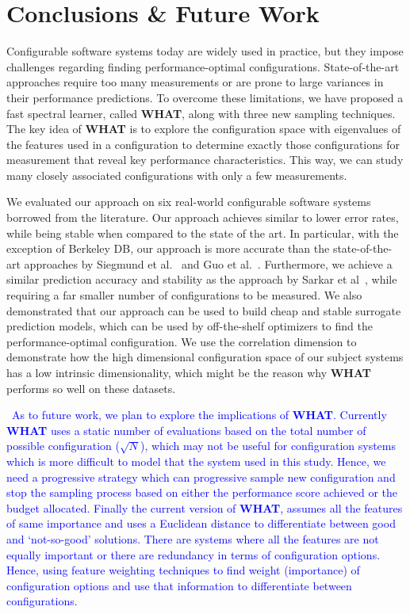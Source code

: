 \documentclass[smallextended]{svjour3}       %
\newcommand{\respto}[1]{
    \fcolorbox{black}{black!15}{
    \label{response:#1}
    \textbf{R-{#1}}}
}
\newcommand{\what}{{\bf WHAT}\xspace}
\begin{document}
\section{Conclusions \& Future Work}

Configurable software systems today are widely used in practice, but they impose challenges
regarding finding performance-optimal configurations. State-of-the-art approaches require too
many measurements or are prone to large variances in their performance predictions. To overcome
these limitations, we have proposed a fast spectral learner, called \what,  along with three
new sampling techniques. The key idea of \what is to explore the configuration space with
eigenvalues of the features used in a configuration to determine exactly those configurations
for measurement that reveal key performance characteristics. 
This way, we can study many closely associated configurations with only a few measurements.

We evaluated our approach on six real-world configurable software systems borrowed from the
literature. Our approach achieves similar to lower error rates, while being stable when
compared to the state of the art. In particular, with the exception of Berkeley DB, our
approach is more accurate than the state-of-the-art approaches by Siegmund et
al.~\cite{siegmund2012predicting} and Guo et al.~\cite{guo2013variability}. Furthermore, we
achieve a similar prediction accuracy and stability as the approach by Sarkar et
al~\cite{sarkar2015cost}, while requiring a far smaller number of configurations to be
measured. We also demonstrated that our approach can be used to build cheap and stable
surrogate prediction models, which can be used by off-the-shelf optimizers to find the
performance-optimal configuration.  We use the correlation dimension to demonstrate how the high dimensional configuration space of our subject systems has a low intrinsic dimensionality, which might be the reason why \what performs so well on these datasets. 

\respto{2f}~\textcolor{blue}{As to future work, we plan to explore the implications of \what{}. Currently \what{} uses a static number of evaluations based on the total number of possible configuration ($\sqrt{N}$), which may not be useful for configuration systems which is more difficult to model that the system used in this study. Hence, we need a progressive strategy which can progressive sample new configuration and stop the sampling process based on either the performance score achieved or the budget allocated. Finally the current version of \what{}, assumes all the features of same importance and uses a Euclidean distance to differentiate between good and `not-so-good' solutions. There are systems where all the features are not equally important or there are redundancy in terms of configuration options. Hence, using feature weighting techniques to find weight (importance) of configuration options and use that information to differentiate between configurations.}
\end{document}
